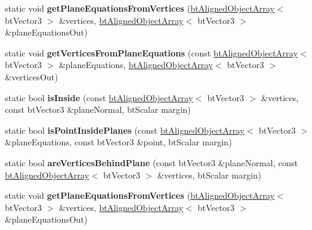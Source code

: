 \begin{DoxyCompactItemize}
\item 
\mbox{\label{classbtGeometryUtil_abaaa4e4ffc288e196135d7ef789f83c3}} 
static void {\bfseries get\+Plane\+Equations\+From\+Vertices} (\hyperlink{classbtAlignedObjectArray}{bt\+Aligned\+Object\+Array}$<$ bt\+Vector3 $>$ \&vertices, \hyperlink{classbtAlignedObjectArray}{bt\+Aligned\+Object\+Array}$<$ bt\+Vector3 $>$ \&plane\+Equations\+Out)
\item 
\mbox{\label{classbtGeometryUtil_a449a76a3bf92bdf5fe5750c9f07578a1}} 
static void {\bfseries get\+Vertices\+From\+Plane\+Equations} (const \hyperlink{classbtAlignedObjectArray}{bt\+Aligned\+Object\+Array}$<$ bt\+Vector3 $>$ \&plane\+Equations, \hyperlink{classbtAlignedObjectArray}{bt\+Aligned\+Object\+Array}$<$ bt\+Vector3 $>$ \&vertices\+Out)
\item 
\mbox{\label{classbtGeometryUtil_a2c6f6ac3418bb1790239f5483ccf1260}} 
static bool {\bfseries is\+Inside} (const \hyperlink{classbtAlignedObjectArray}{bt\+Aligned\+Object\+Array}$<$ bt\+Vector3 $>$ \&vertices, const bt\+Vector3 \&plane\+Normal, bt\+Scalar margin)
\item 
\mbox{\label{classbtGeometryUtil_af9b4081395e9938e8be89807b9b3e527}} 
static bool {\bfseries is\+Point\+Inside\+Planes} (const \hyperlink{classbtAlignedObjectArray}{bt\+Aligned\+Object\+Array}$<$ bt\+Vector3 $>$ \&plane\+Equations, const bt\+Vector3 \&point, bt\+Scalar margin)
\item 
\mbox{\label{classbtGeometryUtil_a85d07406834e51d6e80a97b0ffccd6ca}} 
static bool {\bfseries are\+Vertices\+Behind\+Plane} (const bt\+Vector3 \&plane\+Normal, const \hyperlink{classbtAlignedObjectArray}{bt\+Aligned\+Object\+Array}$<$ bt\+Vector3 $>$ \&vertices, bt\+Scalar margin)
\item 
\mbox{\label{classbtGeometryUtil_ac1181fc738086bc485229793c15c5f4c}} 
static void {\bfseries get\+Plane\+Equations\+From\+Vertices} (\hyperlink{classbtAlignedObjectArray}{bt\+Aligned\+Object\+Array}$<$ bt\+Vector3 $>$ \&vertices, \hyperlink{classbtAlignedObjectArray}{bt\+Aligned\+Object\+Array}$<$ bt\+Vector3 $>$ \&plane\+Equations\+Out)
\item 

\end{DoxyCompactItemize}
